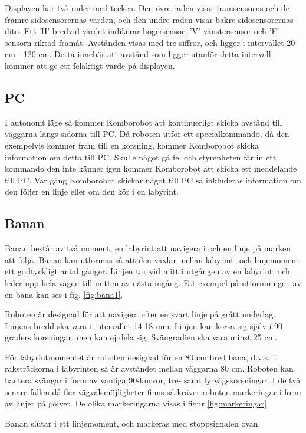 
Displayen har två rader med tecken. Den övre raden visar framsensorns och de främre sidosensorernas värden, och den undre raden visar bakre sidosensorernas dito. Ett 'H' bredvid värdet indikerar högersensor, 'V' vänstersensor och 'F' sensorn riktad framåt. Avstånden visas med tre siffror, och ligger i intervallet 20 cm - 120 cm. Detta innebär att avstånd som ligger utanför detta intervall kommer att ge ett felaktigt värde på displayen. 

\subsection{PC}
I autonomt läge så kommer Komborobot att kontinuerligt skicka avstånd till
väggarna längs sidorna till PC. Då roboten utför ett specialkommando, då den
exempelvis kommer fram till en korsning,  kommer Komborobot skicka information om
detta till PC. Skulle något gå fel och styrenheten får in ett kommando den inte
känner igen kommer Komborobot att skicka ett meddelande till PC. Var gång
Komborobot skickar något till PC så inkluderas information om den följer en
linje eller om den kör i en labyrint.
\subsection{Banan}
\label{sec:banan}

Banan består av två moment, en labyrint att navigera i och en linje på marken att följa. Banan kan utformas så att den växlar mellan labyrint- och linjemoment ett godtyckligt antal gånger. Linjen tar vid mitt i utgången av en labyrint, och leder upp hela vägen till mitten av nästa ingång. Ett exempel på utformningen av en bana kan ses i fig. \ref{fig:bana1}.


Roboten är designad för att navigera efter en svart linje på grått underlag. Linjens bredd ska vara i intervallet 14-18 mm. Linjen kan korsa sig själv i 90 graders korsningar, men kan ej dela sig. Svängradien ska vara minst 25 cm. 

För labyrintmomentet är roboten designad för en 80 cm bred bana, d.v.s. i raksträckorna i labyrinten så är avståndet mellan väggarna 80 cm. Roboten kan hantera svängar i form av vanliga 90\degree-kurvor, tre- samt fyrvägskorsningar. I de två senare fallen då fler vägvalsmöjligheter finns så kräver roboten markeringar i form av linjer på golvet. De olika markeringarna visas i figur \ref{fig:markeringar}


Banan slutar i ett linjemoment, och markeras med stoppsignalen ovan. 

